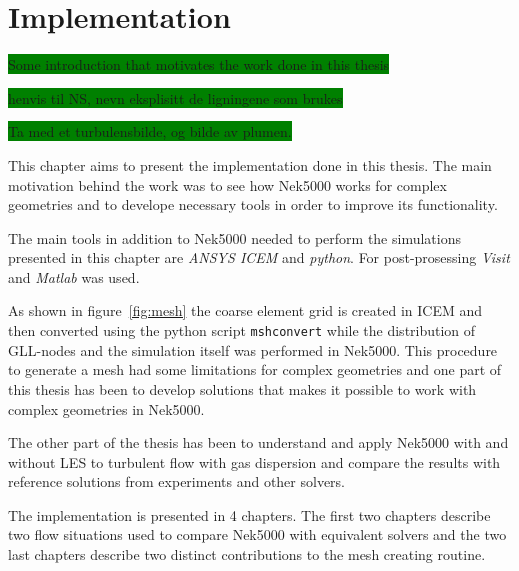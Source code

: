 
\chapter{Implementation} %

\label{implementation} %



\colorbox{green}{Some introduction that motivates the work done in this thesis}

\colorbox{green}{henvis til NS, nevn eksplisitt de ligningene som brukes}

\colorbox{green}{Ta med et turbulensbilde, og bilde av plumen.}

This chapter aims to present the implementation done in this thesis. The main motivation 
behind the work was to see how Nek5000 works for complex geometries and to develope 
necessary tools in order to improve its functionality. 

The main tools in addition to Nek5000 needed to perform the simulations presented in this 
chapter are \textit{ANSYS ICEM} and \textit{python}. For post-prosessing \textit{Visit} and
\textit{Matlab} was used.

As shown in figure~\ref{fig:mesh} the coarse element grid is created
in ICEM and then converted using the python script \verb|mshconvert| while the
distribution of GLL-nodes and the simulation itself was 
performed in Nek5000. This procedure to generate a mesh had some limitations
for complex geometries and one part of this thesis has been to develop solutions that makes it 
possible to work with complex geometries in Nek5000.

The other part of the thesis has been to understand and apply Nek5000 with and without 
LES to turbulent flow with gas dispersion and compare the results with reference 
solutions from experiments and other solvers.

The implementation is presented in 4 chapters. The first two chapters describe two flow situations 
used to compare Nek5000 with equivalent solvers and the two last chapters describe two distinct
contributions to the mesh creating routine. 

